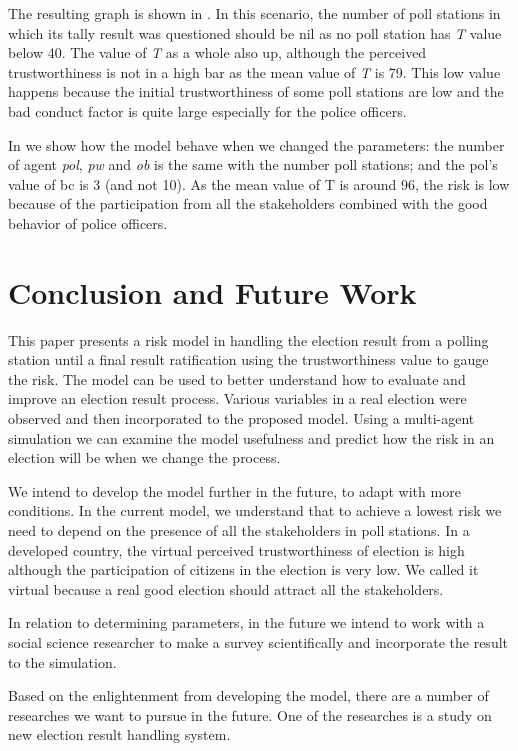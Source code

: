\documentclass[JIP]{ipsj}
\begin{document}
The resulting graph is shown in . In this scenario, the number of poll stations in which its tally result was questioned should be nil as no poll station has \textit{T} value below 40. The value of \textit{T} as a whole also up, although the perceived trustworthiness is not in a high bar as the mean value of \textit{T} is 79. This low value happens because the initial trustworthiness of some poll stations are low and the bad conduct factor is quite large especially for the police officers.

In  we show how the model behave when we changed the parameters: the number of agent \textit{pol}, \textit{pw} and \textit{ob} is the same with the number poll stations; and the pol's value of bc is 3 (and not 10). As the mean value of T is around 96, the risk is low because of the participation from all the stakeholders combined with the good behavior of police officers.


\section{Conclusion and Future Work}

This paper presents a risk model in handling the election result from a polling station until a final result ratification using the trustworthiness value to gauge the risk. The model can be used to better understand how to evaluate and improve an election result process. Various variables in a real election were observed and then incorporated to the proposed model. Using a multi-agent simulation we can examine the model usefulness and predict how the risk in an election will be when we change the process.

We intend to develop the model further in the future, to adapt with more conditions. In the current model, we understand that to achieve a lowest risk we need to depend on the presence of all the stakeholders in poll stations. In a developed country, the virtual perceived trustworthiness of election is high although the participation of citizens in the election is very low. We called it virtual because a real good election should attract all the stakeholders.

In relation to determining parameters, in the future we intend to work with a social science researcher to make a survey scientifically and incorporate the result to the simulation.

Based on the enlightenment from developing the model, there are a number of researches we want to pursue in the future. One of the researches is a study on new election result handling system.
\end{document}
